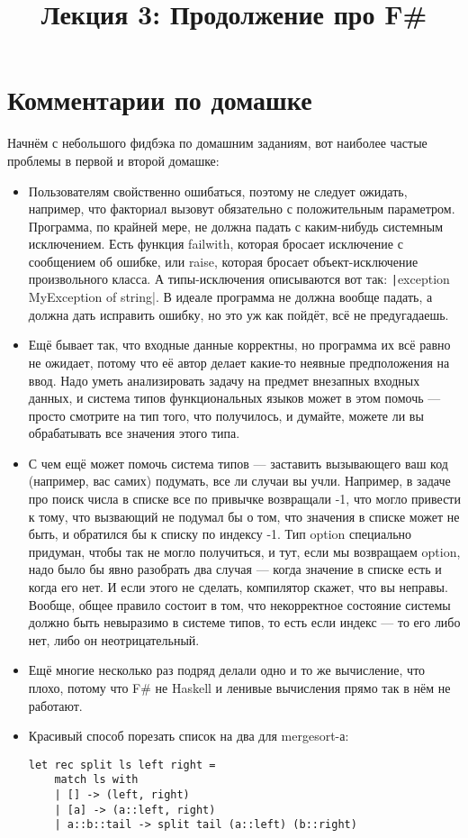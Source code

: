 \documentclass[a5paper]{article}
\title{Лекция 3: Продолжение про F\#}
\date{}
\begin{document}
\maketitle
\thispagestyle{empty}

\section*{Комментарии по домашке}

Начнём с небольшого фидбэка по домашним заданиям, вот наиболее частые проблемы в первой и второй домашке:

\begin{itemize}
    \item Пользователям свойственно ошибаться, поэтому не следует ожидать, например, что факториал вызовут обязательно с положительным параметром. Программа, по крайней мере, не должна падать с каким-нибудь системным исключением. Есть функция failwith, которая бросает исключение с сообщением об ошибке, или raise, которая бросает объект-исключение произвольного класса. А типы-исключения описываются вот так: \texttt|exception MyException of string|. В идеале программа не должна вообще падать, а должна дать исправить ошибку, но это уж как пойдёт, всё не предугадаешь.
    \item Ещё бывает так, что входные данные корректны, но программа их всё равно не ожидает, потому что её автор делает какие-то неявные предположения на ввод. Надо уметь анализировать задачу на предмет внезапных входных данных, и система типов функциональных языков может в этом помочь --- просто смотрите на тип того, что получилось, и думайте, можете ли вы обрабатывать все значения этого типа.
    \item С чем ещё может помочь система типов --- заставить вызывающего ваш код (например, вас самих) подумать, все ли случаи вы учли. Например, в задаче про поиск числа в списке все по привычке возвращали -1, что могло привести к тому, что вызвающий не подумал бы о том, что значения в списке может не быть, и обратился бы к списку по индексу -1. Тип option специально придуман, чтобы так не могло получиться, и тут, если мы возвращаем option, надо было бы явно разобрать два случая --- когда значение в списке есть и когда его нет. И если этого не сделать, компилятор скажет, что вы неправы. Вообще, общее правило состоит в том, что некорректное состояние системы должно быть невыразимо в системе типов, то есть если индекс --- то его либо нет, либо он неотрицательный.
    \item Ещё многие несколько раз подряд делали одно и то же вычисление, что плохо, потому что F\# не Haskell и ленивые вычисления прямо так в нём не работают.
    \item Красивый способ порезать список на два для mergesort-а:
        \begin{verbatim}
let rec split ls left right =
    match ls with
    | [] -> (left, right)
    | [a] -> (a::left, right)
    | a::b::tail -> split tail (a::left) (b::right)
        \end{verbatim}
\end{itemize}
\end{document}
